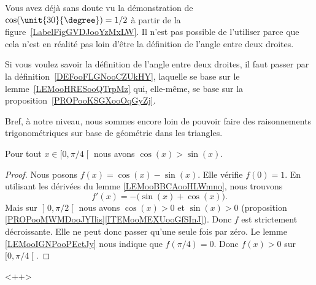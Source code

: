 \begin{remark}
    Vous avez déjà sans doute vu la démonstration de \( \cos(\unit{30}{\degree})=1/2\) à partir de la figure~\ref{LabelFigGVDJooYzMxLW}. Il n'est pas possible de l'utiliser parce que cela n'est en réalité pas loin d'être la définition de l'angle entre deux droites.

    Si vous voulez savoir la définition de l'angle entre deux droites, il faut passer par la définition~\ref{DEFooFLGNooCZUkHY}, laquelle se base sur le lemme~\ref{LEMooHRESooQTrpMz} qui, elle-même, se base sur la proposition~\ref{PROPooKSGXooOqGyZj}.

    Bref, à notre niveau, nous sommes encore loin de pouvoir faire des raisonnements trigonométriques sur base de géométrie dans les triangles.
\end{remark}

\begin{proposition}     \label{PROPooJFAGooYjRJcb}
    Pour tout \( x\in \mathopen[ 0 , \pi/4 \mathclose[\) nous avons \( \cos(x)>\sin(x)\).
\end{proposition}

\begin{proof}
    Nous posons \( f(x)=\cos(x)-\sin(x)\). Elle vérifie \( f(0)=1\). En utilisant les dérivées du lemme \ref{LEMooBBCAooHLWmno}, nous trouvons
    \begin{equation}
        f'(x)=-\big( \sin(x)+\cos(x) \big).
    \end{equation}
Mais sur \( \mathopen] 0 , \pi/2 \mathclose[\) nous avons \( \cos(x)>0\) et \( \sin(x)>0\) (proposition \ref{PROPooMWMDooJYIlis}\ref{ITEMooMEXUooGfSInJ}). Donc \( f\) est strictement décroissante. Elle ne peut donc passer qu'une seule fois par zéro. Le lemme \ref{LEMooIGNPooPEctJy} nous indique que \( f(\pi/4)=0\). Donc \( f(x)>0\) sur \( \mathopen[ 0 , \pi/4 \mathclose[\).
\end{proof}
<++>

